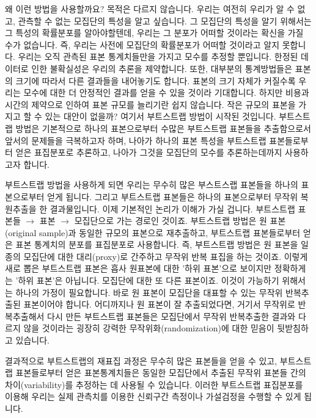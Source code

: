 \documentclass[
]{book}
\begin{document}
왜 이런 방법을 사용할까요? 목적은 다르지 않습니다. 우리는 여전히 우리가 알 수 없고, 관측할 수 없는 모집단의 특성을 알고 싶습니다. 그 모집단의 특성을 알기 위해서는 그 특성의 확률분포를 알아야할텐데, 우리는 그 분포가 어떠할 것이라는 확신을 가질 수가 없습니다. 즉, 우리는 사전에 모집단의 확률분포가 어떠할 것이라고 알지 못합니다. 우리는 오직 관측된 표본 통계치들만을 가지고 모수를 추정할 뿐입니다. 한정된 데이터로 인한 불확실성은 우리의 추론을 제약합니다. 또한, 대부분의 통계방법들은 표본의 크기에 따라서 다른 결과들을 내어놓기도 합니다. 표본의 크기 자체가 커질수록 우리는 모수에 대한 더 안정적인 결과를 얻을 수 있을 것이라 기대합니다. 하지만 비용과 시간의 제약으로 인하여 표본 규모를 늘리기란 쉽지 않습니다. 작은 규모의 표본을 가지고 할 수 있는 대안이 없을까? 여기서 부트스트랩 방법이 시작된 것입니다. 부트스트랩 방법은 기본적으로 하나의 표본으로부터 수많은 부트스트랩 표본들을 추출함으로서 앞서의 문제들을 극복하고자 하며, 나아가 하나의 표본 특성을 부트스트랩 표본들로부터 얻은 표집분포로 추론하고, 나아가 그것을 모집단의 모수를 추론하는데까지 사용하고자 합니다.

부트스트랩 방법을 사용하게 되면 우리는 무수히 많은 부스트스랩 표본들을 하나의 표본으로부터 얻게 됩니다. 그리고 부트스트랩 표본들은 하나의 표본으로부터 무작위 복원추출을 한 결과물입니다. 이제 기본적인 논리가 이해가 가실 겁니다. 부트스트랩 표본들 \(\rightarrow\) 표본 \(\rightarrow\) 모집단으로 가는 경로인 것이죠. 부트스트랩 방법은 원 표본(original sample)과 동일한 규모의 표본으로 재추출하고, 부트스트랩 표본들로부터 얻은 표본 통계치의 분포를 표집분포로 사용합니다. 즉, 부트스트랩 방법은 원 표본을 일종의 모집단에 대한 대리(proxy)로 간주하고 무작위 반복 표집을 하는 것이죠. 이렇게 새로 뽑은 부트스트랩 표본은 흡사 원표본에 대한 '하위 표본'으로 보이지만 정확하게는 '하위 표본'은 아닙니다. 모집단에 대한 또 다른 표본이죠. 이것이 가능하기 위해서는 하나의 가정이 필요합니다. 바로 원 표본이 모집단을 대표할 수 있는 무작위 반복추출된 표본이어야 합니다. 어디까지나 원 표본이 잘 추출되었다면, 거기서 무작위로 반복추출해서 다시 만든 부트스트랩 표본들은 모집단에서 무작위 반복추출한 결과와 다르지 않을 것이라는 굉장히 강력한 무작위화(randomization)에 대한 믿음이 뒷받침하고 있습니다.

결과적으로 부트스트랩의 재표집 과정은 무수히 많은 표본들을 얻을 수 있고, 부트스트랩 표본들로부터 얻은 표본통계치들은 동일한 모집단에서 추출된 무작위 표본들 간의 차이(variability)를 추정하는 데 사용될 수 있습니다. 이러한 부트스트랩 표집분포를 이용해 우리는 실제 관측치를 이용한 신뢰구간 측정이나 가설검정을 수행할 수 있게 됩니다.
\end{document}
